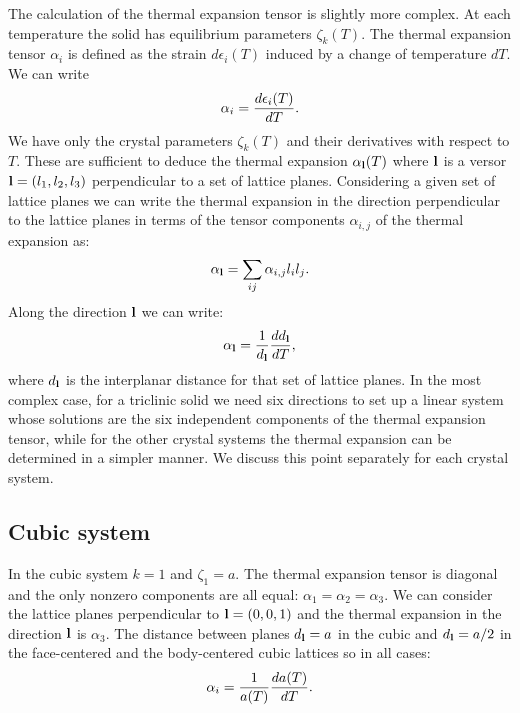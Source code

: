 \documentclass[12pt,a4paper]{article}
\begin{document}
The calculation of the thermal expansion tensor is slightly more
complex. At each temperature the solid has equilibrium parameters
$\zeta_k(T)$. The thermal expansion tensor $\alpha_{i}$ is defined 
as the strain $d\epsilon_{i}(T)$ induced by a change of temperature $dT$. 
We can write
\begin{equation}
\alpha_{i} = {d \epsilon_{i}(T) \over  d T }.
\end{equation}
We have only the crystal parameters $\zeta_k (T)$ and their derivatives
with respect to $T$. These are sufficient to deduce the thermal expansion
$\alpha_{\bf l}(T)$ where ${\bf l}$ is a versor ${\bf l}=(l_1,l_2,l_3)$ 
perpendicular to a set of lattice planes. Considering 
a given set of lattice planes we can write the thermal expansion in
the direction perpendicular to the lattice planes in terms of the tensor 
components $\alpha_{i,j}$
of the thermal expansion as:
\begin{equation}
\alpha_{{\bf l}} = \sum_{ij} \alpha_{i,j} l_i l_j.
\end{equation}
Along the direction ${\bf l}$ we can write:
\begin{equation}
\alpha_{{\bf l}} = {1 \over d_{\bf l}} {d d_{\bf l} \over d T},
\end{equation}
where $d_{\bf l}$ is the interplanar distance for that set of lattice planes.
In the most complex case, for a triclinic solid we need six directions
to set up a linear system whose solutions are the six independent components
of the thermal expansion tensor, while for the other crystal systems 
the thermal expansion can be determined in a simpler manner.
We discuss this point separately for each crystal system.

\subsection{\color{web-blue}Cubic system}
In the cubic system $k=1$ and $\zeta_1=a$. 
The thermal expansion tensor is diagonal and the only nonzero components
are all equal: $\alpha_1=\alpha_2=\alpha_3$. We can consider the 
lattice planes perpendicular to ${\bf l}=(0,0,1)$ and the thermal expansion
in the direction ${\bf l}$ is $\alpha_3$. The distance between planes
$d_{\bf l}=a$ in the cubic and $d_{\bf l}=a/2$ in the face-centered
and the body-centered cubic lattices so in all cases:  
\begin{equation}
\alpha_{i} =  {1\over a(T) } {d a(T) \over dT}.
\end{equation}
\end{document}
